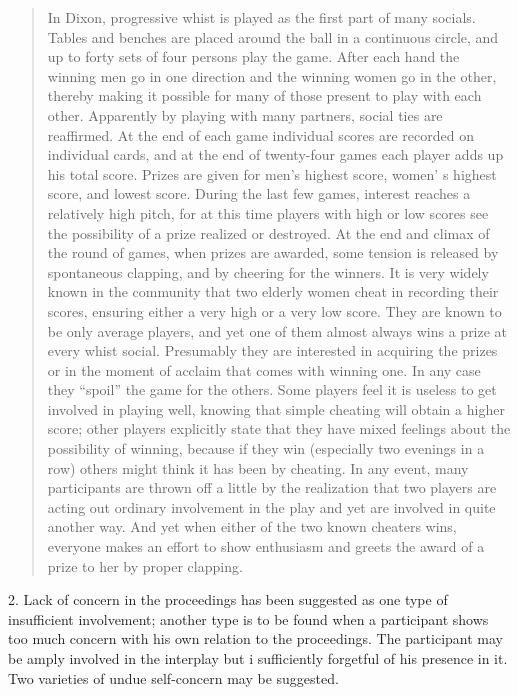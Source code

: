 \documentclass[twoside,symmetric,nobib,justified]{tufte-book}
\begin{document}
\begin{quote}
In Dixon, progressive whist is played as the first part of many socials.
Tables and benches are placed around the ball in a continuous circle,
and up to forty sets of four persons play the game. After each hand the
winning men go in one direction and the winning women go in the other,
thereby making it possible for many of those present to play with each
other. Apparently by playing with many partners, social ties are
reaffirmed. At the end of each game individual scores are recorded on
individual cards, and at the end of twenty-four games each player adds
up his total score. Prizes are given for men's highest score, women' s
highest score, and lowest score. During the last few games, interest
reaches a relatively high pitch, for at this time players with high or
low scores see the possibility of a prize realized or destroyed. At the
end and climax of the round of games, when prizes are awarded, some
tension is released by spontaneous clapping, and by cheering for the
winners. It is very widely known in the community that two elderly women
cheat in recording their scores, ensuring either a very high or a very
low score. They are known to be only average players, and yet one of
them almost always wins a prize at every whist social. Presumably they
are interested in acquiring the prizes or in the moment of acclaim that
comes with winning one. In any case they ``spoil'' the game for the
others. Some players feel it is useless to get involved in playing well,
knowing that simple cheating will obtain a higher score; other players
explicitly state that they have mixed feelings about the possibility of
winning, because if they win (especially two evenings in a row) others
might think it has been by cheating. In any event, many participants are
thrown off a little by the realization that two players are acting out
ordinary involvement in the play and yet are involved in quite another
way. And yet when either of the two known cheaters wins, everyone makes
an effort to show enthusiasm and greets the award of a prize to her by
proper clapping.
\end{quote}

\enlargethispage{\baselineskip}

2. Lack of concern in the proceedings has been suggested as one type of
insufficient involvement; another type is to be found when a participant
shows too much concern with his own relation to the proceedings. The
participant may be amply involved in the interplay but i sufficiently
forgetful of his presence in it. Two varieties of undue self-concern may
be suggested.
\end{document}
